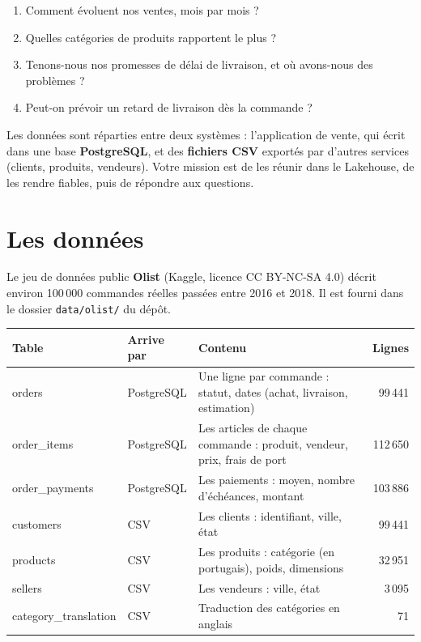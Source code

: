 \documentclass[11pt,a4paper]{article}
\newcommand{\cmd}[1]{\texttt{#1}}
\begin{document}
\begin{enumerate}[leftmargin=*,nosep]
  \item Comment évoluent nos ventes, mois par mois ?
  \item Quelles catégories de produits rapportent le plus ?
  \item Tenons-nous nos promesses de délai de livraison, et où avons-nous des problèmes ?
  \item Peut-on prévoir un retard de livraison dès la commande ?
\end{enumerate}

Les données sont réparties entre deux systèmes : l'application de vente, qui écrit dans une base
\textbf{PostgreSQL}, et des \textbf{fichiers CSV} exportés par d'autres services (clients, produits,
vendeurs). Votre mission est de les réunir dans le Lakehouse, de les rendre fiables, puis de répondre
aux questions.

\section{Les données}

Le jeu de données public \textbf{Olist} (Kaggle, licence CC BY-NC-SA 4.0) décrit environ
100\,000 commandes réelles passées entre 2016 et 2018. Il est fourni dans le dossier
\cmd{data/olist/} du dépôt.

\begin{center}
\small
\renewcommand{\arraystretch}{1.25}
\begin{tabularx}{\textwidth}{@{}>{\ttfamily}l l X r@{}}
\toprule
\normalfont\textbf{Table} & \textbf{Arrive par} & \textbf{Contenu} & \textbf{Lignes} \\
\midrule
orders          & PostgreSQL & Une ligne par commande : statut, dates (achat, livraison, estimation) & 99\,441 \\
order\_items    & PostgreSQL & Les articles de chaque commande : produit, vendeur, prix, frais de port & 112\,650 \\
order\_payments & PostgreSQL & Les paiements : moyen, nombre d'échéances, montant & 103\,886 \\
customers       & CSV & Les clients : identifiant, ville, état & 99\,441 \\
products        & CSV & Les produits : catégorie (en portugais), poids, dimensions & 32\,951 \\
sellers         & CSV & Les vendeurs : ville, état & 3\,095 \\
category\_translation & CSV & Traduction des catégories en anglais & 71 \\
\bottomrule
\end{tabularx}
\end{center}
\end{document}
